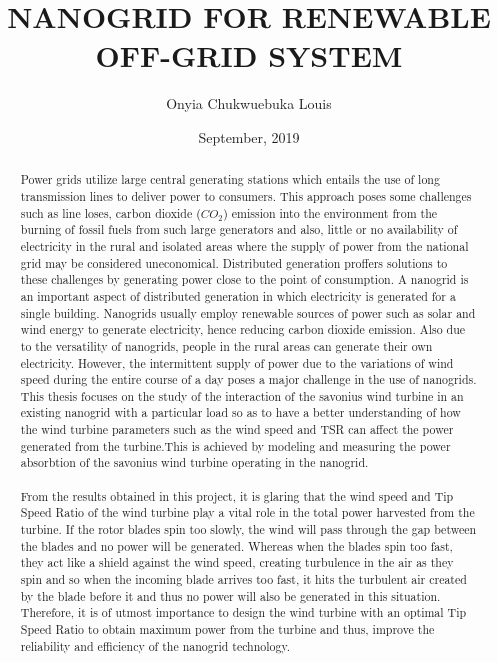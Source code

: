\documentclass[titlepage]{article}
\title{NANOGRID FOR RENEWABLE OFF-GRID SYSTEM}
\author{Onyia Chukwuebuka Louis }
\date{September, 2019}
\newcommand\blankpage{
    \null
    \thispagestyle{empty}
    \addtocounter{page}{-1}
    \newpage
    }
\begin{document}
    \afterpage{\blankpage}
    \maketitle
    \afterpage{\blankpage}
    \begin{abstract}
    Power grids utilize large central generating stations which entails the use of long transmission lines to deliver power to consumers. This approach poses some challenges such as line loses, carbon dioxide ($CO_{2}$) emission into the environment from the burning of fossil fuels from such large generators and also, little or no availability of electricity in the rural and isolated areas where the supply of power from the national grid may be considered uneconomical. Distributed generation proffers solutions to these challenges by generating power close to the point of consumption. A nanogrid is an important aspect of distributed generation in which electricity is generated for a single building. Nanogrids usually employ renewable sources of power such as solar and wind energy to generate electricity, hence reducing carbon dioxide emission. Also due to the versatility of nanogrids, people in the rural areas can generate their own electricity. However, the intermittent supply of power due to the variations of wind speed during the entire course of a day poses a major challenge in the use of nanogrids. This thesis focuses on the study of the interaction of the savonius wind turbine in an existing nanogrid with a particular load so as to have a better understanding of how the wind turbine parameters such as the wind speed and TSR can affect the power generated from the turbine.This is achieved by modeling and measuring the power absorbtion of the savonius wind turbine operating in the nanogrid. 
    \paragraph{}From the results obtained in this project, it is glaring that the wind speed and Tip Speed Ratio of the wind turbine play a vital role in the total power harvested from the turbine. If the rotor blades spin too slowly, the wind will pass through the gap between the blades and no power will be generated. Whereas when the blades spin too fast, they act like a shield against the wind speed, creating turbulence in the air as they spin and so when the incoming blade arrives too fast, it hits the turbulent air created by the blade before it and thus no power will also be generated in this situation. Therefore,  it is of utmost importance to design the wind turbine with an optimal Tip Speed Ratio to obtain maximum power from the turbine and thus, improve the reliability and efficiency of the nanogrid technology. 
    \end{abstract}
\tableofcontents
\clearpage
{}
\listoffigures
\listoftables
\clearpage
\end{document}
